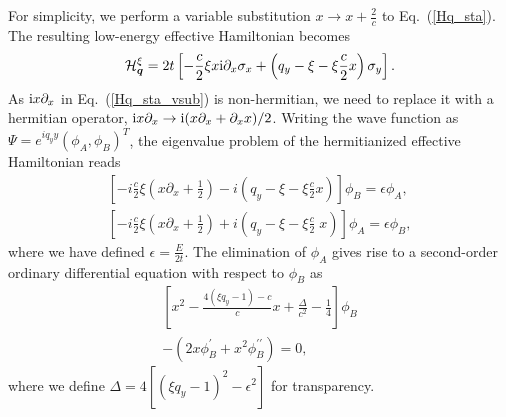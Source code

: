 \documentclass[aps, twocolumn, floatfix, superscriptaddress, prb]{revtex4-1}
\begin{document}
For simplicity, we perform a variable substitution $x\rightarrow x+\frac2c$ to Eq.~(\ref{Hq_sta}). The resulting low-energy effective Hamiltonian becomes
%
\begin{equation}\label{Hq_sta_vsub}
\mathcal{H}^\xi_{\bm{q}}=2t\left[-\frac{c}{2}\xi x{\rm i}\partial_x\sigma_x+\left(q_y-\xi-\xi\frac{c}{2}x\right)\sigma_y\right].
\end{equation}
%
As ${\rm i}x\partial_x$ in Eq.~(\ref{Hq_sta_vsub}) is non-hermitian, we need to replace it with a hermitian operator, {${\rm i}x\partial_x\rightarrow {\rm i}(x\partial_x+\partial_xx)/2$}. Writing the wave function as $\Psi=e^{iq_yy}(\phi_A, \phi_B)^T$, the eigenvalue problem of the hermitianized effective Hamiltonian reads
%
\begin{equation}
\begin{split}
\left[ -i\frac{c}{2}\xi\left(x\partial_x +\frac{1}{2}\right)-i\left(q_y -\xi-\xi\frac{c}{2}x\right)\right] \phi_B =\epsilon \phi_A,
\\
\left[ -i\frac{c}{2}\xi\left(x\partial_x +\frac{1}{2}\right)+i\left(q_y -\xi-\xi\frac{c}{2}\;x\right)\right] \phi_A =\epsilon \phi_B,
\end{split}
\end{equation}
%
where we have defined $\epsilon=\frac{E}{2t}$. The elimination of $\phi_A$ gives rise to a second-order ordinary differential equation with respect to $\phi_B$ as
%
\begin{equation}\label{ode}
\begin{split}
\left[ x^2 -\frac{4\left(\xi q_y -1\right)-c}{c}x+\frac{\Delta }{c^2 } - \frac{1}{4}\right] \phi_B
\\
-\left(2x\phi_B^{\prime } +x^2 \phi_B^{\prime \prime } \right)=0,
\end{split}
\end{equation}
%
where we define {$\Delta =4 [(\xi q_y -1)^2 -\epsilon^2]$} for transparency.
\end{document}
